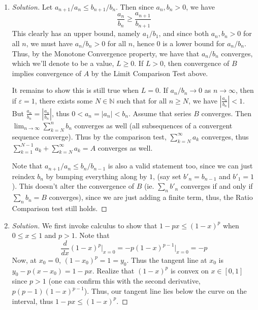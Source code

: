 \documentclass{article}
\newcommand{\N}{{\mathbb N}}
\newcommand{\ep}{{\varepsilon}}
\begin{document}
{\begin{enumerate}
\begin{proof}[Solution]
		Now, note that if $b_n/a_n$ converges to some positive value,
		$a_n/b_n$ must converge to some positive value as well,
		specifically, $L^{-1}$
		(by Rudin Theorem 3.3 (d)),
		since $b_n/a_n \neq0$ for all $n$ and $L\neq0$.
		Thus, we can repeat an identical argument to the one above
		to show that $B$ converging implies $A$ converging
		(where we just swap the $a_n$'s and $b_n$'s around).
	\end{proof}
	\item \begin{proof}[Solution]\let\qed\relax
		Let $a_{n+1}/a_n \leq b_{n+1}/b_n$.
		Then since $a_n,b_n > 0$, we have
		\[
			\frac{a_n}{b_n} \geq \frac{a_{n+1}}{b_{n+1}}
		\]
		This clearly has an upper bound,
		namely $a_1/b_1$,
		and since both $a_n,b_n > 0$ for all $n$, we must have
		$a_n/b_n > 0$ for all $n$,
		hence $0$ is a lower bound for $a_n/b_n$.
		Thus, by the Monotone Convergence property,
		we have that $a_n/b_n$ converges,
		which we'll denote to be a value, $L \geq 0$.
		If $L > 0$,
		then convergence of $B$ implies convergence of $A$
		by the Limit Comparison Test above.

		It remains to show this is still true when $L = 0$.
		If $a_n/b_n \to 0$ as $n \to \infty$,
		then if $\ep = 1$,
		there exists some $N \in \N$ such that for all $n \geq N$,
		we have $\left|\frac{a_n}{b_n}\right| < 1$.
		But $\frac{a_n}{b_n} = \left|\frac{a_n}{b_n}\right|$,
		thus $0 < a_n = |a_n| < b_n$.
		Assume that series $B$ converges.
		Then $\lim_{n\to\infty}\sum_{k=N}^nb_n$ converges as well
		(all subsequences of a convergent sequence converge).
		Thus by the comparison test, $\sum_{k=N}^\infty a_k$ converges,
		thus $\sum_{k=1}^{N-1}a_k + \sum_{k=N}^\infty a_k = A$
		converges as well.

		Note that $a_{n+1}/a_n \leq b_n/b_{n-1}$ is also a valid
		statement too,
		since we can just reindex $b_n$ by bumping everything along by $1$,
		(say set $b'_n = b_{n-1}$ and $b'_1 = 1$).
		This doesn't alter the convergence of $B$ (ie. $\sum_n b'_n$ converges
		if and only if $\sum_n b_n = B$ converges),
		since we are just adding a finite term,
		thus, the Ratio Comparison test still holds.
	\end{proof}
	\item \begin{proof}[Solution]\let\qed\relax
		We first invoke calculus to show that $1 - px \leq (1-x)^p$
		when $0 \leq x \leq 1$ and $p > 1$.
		Note that
		\[
			\frac{d}{dx}(1-x)^p\vert_{x=0} = -p(1-x)^{p-1}\vert_{x=0} = -p
		\]
		Now, at $x_0 = 0$, $(1-x_0)^p = 1 = y_0$.
		Thus the tangent line at $x_0$ is $y_0 - p(x-x_0) = 1-px$.
		Realize that $(1-x)^p$ is convex on $x \in [0,1]$
		since $p > 1$
		(one can confirm this with the second derivative, $p(p-1)(1-x)^{p-1}$).
		Thus, our tangent line lies below the curve on the interval,
		thus $1-px \leq (1-x)^p$.


\end{proof}
\end{enumerate}}
\end{document}
